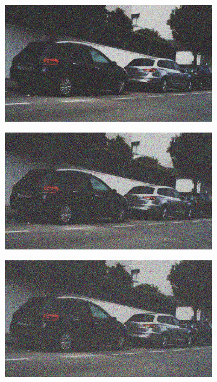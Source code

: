 \documentclass[a4paper]{ctexart}
\begin{document}
\begin{figure}[htbp]
\begin{subfigure}{0.08\textwidth}
				\label{fig：Gamma=0.2, Gauss Noise = 0.4}
			\end{subfigure}
			\begin{subfigure}{0.08\textwidth}
				\captionsetup{font=scriptsize}
				\includegraphics[width=\linewidth]{picture/Edge Detection/degrade/RGB_001 Gamma=0.2, Gauss Noise=0.5}
				\label{fig：Gamma=0.2, Gauss Noise = 0.5}
			\end{subfigure}
			\begin{subfigure}{0.08\textwidth}
				\captionsetup{font=scriptsize}
				\includegraphics[width=\linewidth]{picture/Edge Detection/degrade/RGB_001 Gamma=0.2, Gauss Noise=0.6}
				\label{fig：Gamma=0.2, Gauss Noise = 0.6}
			\end{subfigure}
			\begin{subfigure}{0.08\textwidth}
				\captionsetup{font=scriptsize}
				\includegraphics[width=\linewidth]{picture/Edge Detection/degrade/RGB_001 Gamma=0.2, Gauss Noise=0.7}

\end{subfigure}
\end{figure}
\end{document}
